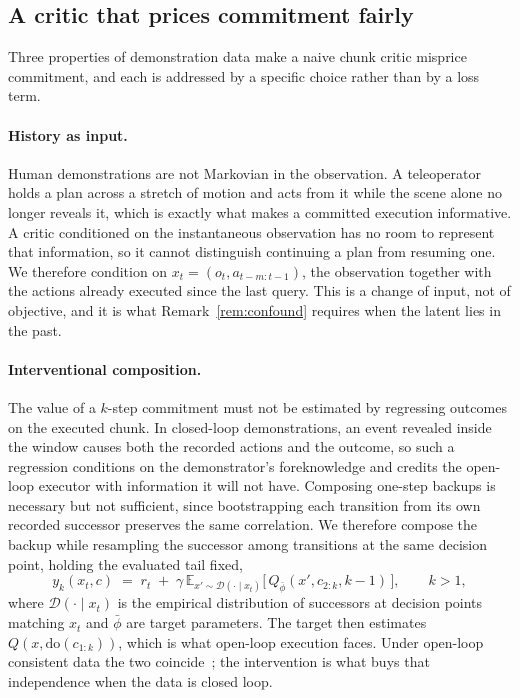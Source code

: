 \subsection{A critic that prices commitment fairly}
\label{sec:method:critic}

Three properties of demonstration data make a naive chunk critic misprice commitment, and each is
addressed by a specific choice rather than by a loss term.

\paragraph{History as input.}
Human demonstrations are not Markovian in the observation. A teleoperator holds a plan across a
stretch of motion and acts from it while the scene alone no longer reveals it, which is exactly what
makes a committed execution informative. A critic conditioned on the instantaneous observation has
no room to represent that information, so it cannot distinguish continuing a plan from resuming
one. We therefore condition on $x_t=(o_t, a_{t-m:t-1})$, the observation together with the actions
already executed since the last query. This is a change of input, not of objective, and it is what
Remark~\ref{rem:confound} requires when the latent lies in the past.

\paragraph{Interventional composition.}
The value of a $k$-step commitment must not be estimated by regressing outcomes on the executed
chunk. In closed-loop demonstrations, an event revealed inside the window causes both the recorded
actions and the outcome, so such a regression conditions on the demonstrator's foreknowledge and
credits the open-loop executor with information it will not have. Composing one-step backups is
necessary but not sufficient, since bootstrapping each transition from its own recorded successor
preserves the same correlation. We therefore compose the backup while resampling the successor
among transitions at the same decision point, holding the evaluated tail fixed,
\begin{equation}
\label{eq:method-interv}
y_k(x_t, c) \;=\; r_t \;+\; \gamma\, \mathbb E_{x' \sim \mathcal{D}(\cdot \mid x_t)}
\big[\, Q_{\bar\phi}(x', c_{2:k}, k-1) \,\big],
\qquad k > 1,
\end{equation}
where $\mathcal D(\cdot\mid x_t)$ is the empirical distribution of successors at decision points
matching $x_t$ and $\bar\phi$ are target parameters. The target then estimates
$Q(x,\mathrm{do}(c_{1:k}))$, which is what open-loop execution faces. Under open-loop consistent
data the two coincide~\citep{dqc}; the intervention is what buys that independence when the data is
closed loop.

